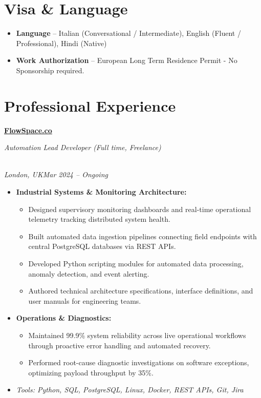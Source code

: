 \documentclass[a4paper,10pt]{article}
\newcommand{\role}[4]{\vspace{3pt}\noindent\hspace{0.6em}\parbox[t]{0.38\textwidth}{\raggedright\textbf{#1}}\hfill\parbox[t]{0.58\textwidth}{\raggedleft\textit{#2}}\\{\textit{#3}\hfill\textit{#4}}\vspace{1pt}}
\begin{document}
\section{Visa \& Language}
\begin{itemize}
\item \textbf{Language} -- Italian (Conversational / Intermediate), English (Fluent / Professional), Hindi (Native)
\item \textbf{Work Authorization} -- European Long Term Residence Permit - No Sponsorship required.
\end{itemize}

\section{Professional Experience}
\role{\href{https://flowspace.co}{FlowSpace.co}}{Automation Lead Developer (Full time, Freelance)}{London, UK}{Mar 2024 -- Ongoing}
\begin{itemize}
\item \textbf{Industrial Systems \& Monitoring Architecture:}
\begin{itemize}[label=--]
\item Designed supervisory monitoring dashboards and real-time operational telemetry tracking distributed system health.
\item Built automated data ingestion pipelines connecting field endpoints with central PostgreSQL databases via REST APIs.
\item Developed Python scripting modules for automated data processing, anomaly detection, and event alerting.
\item Authored technical architecture specifications, interface definitions, and user manuals for engineering teams.
\end{itemize}
\item \textbf{Operations \& Diagnostics:}
\begin{itemize}[label=--]
\item Maintained 99.9\% system reliability across live operational workflows through proactive error handling and automated recovery.
\item Performed root-cause diagnostic investigations on software exceptions, optimizing payload throughput by 35\%.
\end{itemize}
\item \textit{Tools: Python, SQL, PostgreSQL, Linux, Docker, REST APIs, Git, Jira}
\end{itemize}
\end{document}
